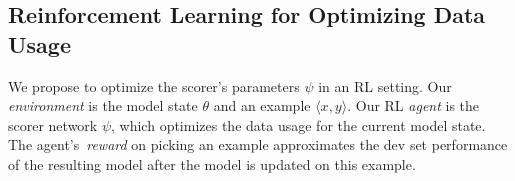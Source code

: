 \subsection{\label{sec:efficient_reward} Reinforcement Learning for Optimizing Data Usage}
We propose to optimize the scorer's parameters $\psi$ in an RL setting.
Our \emph{environment} is the model state $\theta$ and an example $\langle x, y \rangle$. Our RL \emph{agent} is the scorer network $\psi$, which optimizes the data usage for the current model state. The agent's~\emph{reward} on picking an example approximates the dev set performance of the resulting model after the model is updated on this example.



